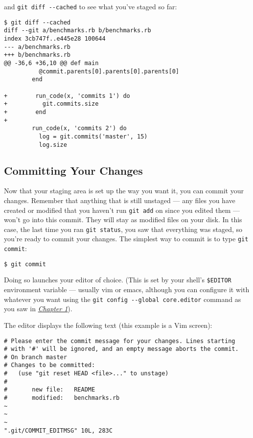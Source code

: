 \documentclass[a4paper]{book}
\newcommand{\prechap}{Chapter }
\newcommand{\postchap}{}
\newcommand{\chapref}[1]{\hyperref[chap:#1]{\prechap #1\postchap}}
\begin{document}
and \texttt{git diff -{}-cached} to see what you've staged so far:

\begin{shaded}\begin{verbatim}
$ git diff --cached
diff --git a/benchmarks.rb b/benchmarks.rb
index 3cb747f..e445e28 100644
--- a/benchmarks.rb
+++ b/benchmarks.rb
@@ -36,6 +36,10 @@ def main
          @commit.parents[0].parents[0].parents[0]
        end

+        run_code(x, 'commits 1') do
+          git.commits.size
+        end
+
        run_code(x, 'commits 2') do
          log = git.commits('master', 15)
          log.size
\end{verbatim}\end{shaded}

\subsection{Committing Your Changes}

Now that your staging area is set up the way you want it, you can commit your changes. Remember that anything that is still unstaged --- any files you have created or modified that you haven't run \texttt{git add} on since you edited them --- won't go into this commit. They will stay as modified files on your disk. In this case, the last time you ran \texttt{git status}, you saw that everything was staged, so you're ready to commit your changes. The simplest way to commit is to type \texttt{git commit}:

\begin{shaded}\begin{verbatim}
$ git commit
\end{verbatim}\end{shaded}

Doing so launches your editor of choice. (This is set by your shell's \texttt{\$EDITOR} environment variable --- usually vim or emacs, although you can configure it with whatever you want using the \texttt{git config -{}-global core.editor} command as you saw in \emph{\chapref{1}}).

The editor displays the following text (this example is a Vim screen):

\begin{shaded}\begin{verbatim}
# Please enter the commit message for your changes. Lines starting
# with '#' will be ignored, and an empty message aborts the commit.
# On branch master
# Changes to be committed:
#   (use "git reset HEAD <file>..." to unstage)
#
#       new file:   README
#       modified:   benchmarks.rb
~
~
~
".git/COMMIT_EDITMSG" 10L, 283C
\end{verbatim}\end{shaded}
\end{document}
